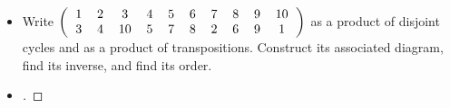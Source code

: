 \documentclass[paper=usletter, fontsize=12pt]{article}
\begin{document}
\begin{itemize}
\begin{itemize}
\begin{itemize}
\begin{proof}[\unskip\nopunct]
\begin{align*}
                            \begin{tabular}{ccccccc}
                                2 & 3 & 6 & 7 & 4 & 1 & 5 \\
                                3 & 7 & 1 & 4 & 6 & 2 & 5
                            \end{tabular}
                        \right)\left(
                            \begin{tabular}{ccccccc}
                                1 & 2 & 3 & 4 & 5 & 6 & 7 \\
                                3 & 2 & 5 & 4 & 6 & 1 & 7
                            \end{tabular}
                        \right) \\
                        & = \left(
                            \begin{tabular}{ccccccc}
                                2 & 3 & 6 & 7 & 4 & 1 & 5 \\
                                5 & 7 & 3 & 4 & 1 & 2 & 6
                            \end{tabular}
                        \right)
                    \end{align*} \qedhere
                    \endgroup
                \end{proof}
                \vspace{0.2in}

            \end{itemize}

            \item[\textbf{3}] Write $\left(
                \begin{tabular}{cccccccccc}
                    1 & 2 & 3 & 4 & 5 & 6 & 7 & 8 & 9 & 10 \\
                    3 & 4 & 10 & 5 & 7 & 8 & 2 & 6 & 9 & 1
                \end{tabular}
            \right)$ as a product of disjoint cycles and as a product of
            transpositions. Construct its associated diagram, find its inverse,
            and find its order.
            \item[\textbf{Ans}]
            \begin{proof}[\unskip\nopunct]


\end{proof}
\end{itemize}
\end{itemize}
\end{document}
